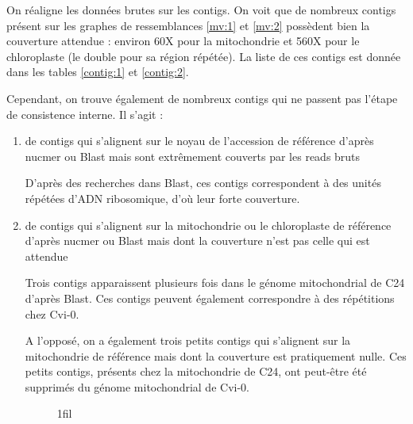 \documentclass[a4paper]{article}
\makeatletter
\newcommand*{\centerfloat}{%
  \parindent \z@
  \leftskip \z@ \@plus 1fil \@minus \textwidth
  \rightskip\leftskip
  \parfillskip \z@skip}
\makeatother
\begin{document}
On réaligne les données brutes sur les contigs. On voit que de nombreux contigs présent sur les graphes de ressemblances \ref{mv:1} et \ref{mv:2} possèdent bien la couverture attendue : environ 60X pour la mitochondrie et 560X pour le chloroplaste (le double pour sa région répétée). La liste de ces contigs est donnée dans les tables \ref{contig:1} et \ref{contig:2}. 

Cependant, on trouve également de nombreux contigs qui ne passent pas l'étape de consistence interne. Il s'agit : 
\begin{enumerate}
\item de contigs qui s'alignent sur le noyau de l'accession de référence d'après nucmer ou Blast mais sont extrêmement couverts par les reads bruts 

D'après des recherches dans Blast, ces contigs correspondent à des unités répétées d'ADN ribosomique, d'où leur forte couverture.

\item de contigs qui s'alignent sur la mitochondrie ou le chloroplaste de référence d'après nucmer ou Blast mais dont la couverture n'est pas celle qui est attendue

Trois contigs apparaissent plusieurs fois dans le génome mitochondrial de C24 d'après Blast. Ces contigs peuvent également correspondre à des répétitions chez Cvi-0. 

A l'opposé, on a également trois petits contigs qui s'alignent sur la mitochondrie de référence mais dont la couverture est pratiquement nulle. Ces petits contigs, présents chez la mitochondrie de C24, ont peut-être été supprimés du génome mitochondrial de Cvi-0.

\begin{figure}[!ht]
\centerfloat

 \hspace{5mm}
\end{figure}
\end{enumerate}
\end{document}
